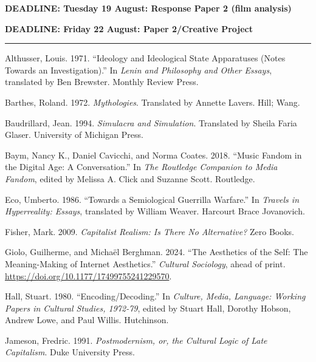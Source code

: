 \documentclass[
  letterpaper,
  DIV=11,
  numbers=noendperiod]{scrartcl}
\newlength{\cslhangindent}
\newenvironment{CSLReferences}[2] %
 {\begin{list}{}{%
  \setlength{\itemindent}{0pt}
  \setlength{\leftmargin}{0pt}
  \setlength{\parsep}{0pt}
  \ifodd #1
   \setlength{\leftmargin}{\cslhangindent}
   \setlength{\itemindent}{-1\cslhangindent}
  \fi
  \setlength{\itemsep}{#2\baselineskip}}}
 {\end{list}}
\begin{document}
\textbf{DEADLINE: Tuesday 19 August: Response Paper 2 (film analysis)}

\textbf{DEADLINE: Friday 22 August: Paper 2/Creative Project}

\begin{center}\rule{0.5\linewidth}{0.5pt}\end{center}

\label{refs}
\begin{CSLReferences}{1}{1}
Althusser, Louis. 1971. {``Ideology and Ideological State Apparatuses
(Notes Towards an Investigation).''} In \emph{Lenin and Philosophy and
Other Essays}, translated by Ben Brewster. Monthly Review Press.

Barthes, Roland. 1972. \emph{Mythologies}. Translated by Annette Lavers.
Hill; Wang.

Baudrillard, Jean. 1994. \emph{Simulacra and Simulation}. Translated by
Sheila Faria Glaser. University of Michigan Press.

Baym, Nancy K., Daniel Cavicchi, and Norma Coates. 2018. {``Music Fandom
in the Digital Age: A Conversation.''} In \emph{The Routledge Companion
to Media Fandom}, edited by Melissa A. Click and Suzanne Scott.
Routledge.

Eco, Umberto. 1986. {``Towards a Semiological Guerrilla Warfare.''} In
\emph{Travels in Hyperreality: Essays}, translated by William Weaver.
Harcourt Brace Jovanovich.

Fisher, Mark. 2009. \emph{Capitalist Realism: Is There No Alternative?}
Zero Books.

Giolo, Guilherme, and Michaël Berghman. 2024. {``The Aesthetics of the
Self: The Meaning-Making of Internet Aesthetics.''} \emph{Cultural
Sociology}, ahead of print.
\url{https://doi.org/10.1177/17499755241229570}.

Hall, Stuart. 1980. {``Encoding/Decoding.''} In \emph{Culture, Media,
Language: Working Papers in Cultural Studies, 1972-79}, edited by Stuart
Hall, Dorothy Hobson, Andrew Lowe, and Paul Willis. Hutchinson.

Jameson, Fredric. 1991. \emph{Postmodernism, or, the Cultural Logic of
Late Capitalism}. Duke University Press.


\end{CSLReferences}
\end{document}
